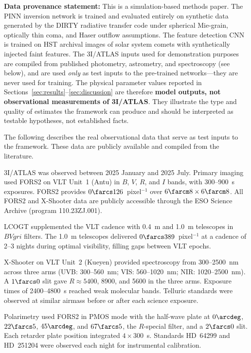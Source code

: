\documentclass[preprint2]{aastex631}
\begin{document}
\textbf{Data provenance statement:} This is a simulation-based methods paper. The PINN inversion network is trained and evaluated entirely on synthetic data generated by the DIRTY radiative transfer code \citep{gordon01} under spherical Mie-grain, optically thin coma, and Haser outflow assumptions. The feature detection CNN is trained on HST archival images of solar system comets with synthetically injected faint features. The 3I/ATLAS inputs used for demonstration purposes are compiled from published photometry, astrometry, and spectroscopy (see below), and are used \textit{only} as test inputs to the pre-trained networks---they are never used for training. The physical parameter values reported in Sections~\ref{sec:results}--\ref{sec:discussion} are therefore \textbf{model outputs, not observational measurements of 3I/ATLAS}. They illustrate the type and quality of estimates the framework can produce and should be interpreted as testable hypotheses, not established facts.

The following describes the real observational data that serve as test inputs to the framework. These data are publicly available and compiled from the literature.

3I/ATLAS was observed between 2025 January and 2025 July. Primary imaging used FORS2 on VLT Unit~1 (Antu) in $B$, $V$, $R$, and $I$ bands, with 300--900~s exposures. FORS2 provides $0\farcs126$~pixel$^{-1}$ over $6\farcm8 \times 6\farcm8$. All FORS2 and X-Shooter data are publicly accessible through the ESO Science Archive (program 110.23ZJ.001).

LCOGT supplemented the VLT cadence with 0.4~m and 1.0~m telescopes in $BVgri$ filters. The 1.0~m telescopes delivered $0\farcs389$~pixel$^{-1}$ at a cadence of 2--3 nights during optimal visibility, filling gaps between VLT epochs.

X-Shooter on VLT Unit~2 (Kueyen) provided spectroscopy from 300--2500~nm across three arms (UVB: 300--560~nm; VIS: 560--1020~nm; NIR: 1020--2500~nm). A $1\farcs0$ slit gave $R \approx 5400$, 8900, and 5600 in the three arms. Exposure times of 2400--4800~s reached weak molecular bands. Telluric standards were observed at similar airmass before or after each science exposure.

Polarimetry used FORS2 in PMOS mode with the half-wave plate at $0\arcdeg$, $22\farcs5$, $45\arcdeg$, and $67\farcs5$, the $R$-special filter, and a $2\farcs0$ slit. Each retarder plate position integrated $4 \times 300$~s. Standards HD~64299 and HD~251204 were observed each night for instrumental calibration.
\end{document}
